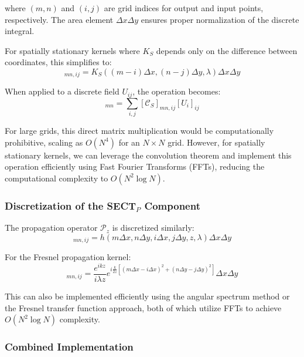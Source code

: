 \documentclass[a4paper,12pt]{article}
\begin{document}
where $(m,n)$ and $(i,j)$ are grid indices for output and input points, respectively. The area element $\Delta x \Delta y$ ensures proper normalization of the discrete integral.

For spatially stationary kernels where $K_S$ depends only on the difference between coordinates, this simplifies to:
\begin{equation}
[\mathcal{C}_S]_{mn,ij} = K_S((m-i)\Delta x, (n-j)\Delta y, \lambda) \Delta x \Delta y
\end{equation}

When applied to a discrete field $U_{ij}$, the operation becomes:
\begin{equation}
[U_s]_{mn} = \sum_{i,j} [\mathcal{C}_S]_{mn,ij} [U_i]_{ij}
\end{equation}

For large grids, this direct matrix multiplication would be computationally prohibitive, scaling as $O(N^4)$ for an $N \times N$ grid. However, for spatially stationary kernels, we can leverage the convolution theorem and implement this operation efficiently using Fast Fourier Transforms (FFTs), reducing the computational complexity to $O(N^2 \log N)$.

\subsubsection{Discretization of the SECT$_P$ Component}

The propagation operator $\mathcal{P}_z$ is discretized similarly:
\begin{equation}
[\mathcal{P}_z]_{mn,ij} = h(m\Delta x, n\Delta y, i\Delta x, j\Delta y, z, \lambda) \Delta x \Delta y
\end{equation}

For the Fresnel propagation kernel:
\begin{equation}
[\mathcal{P}_z]_{mn,ij} = \frac{e^{ikz}}{i\lambda z} e^{i\frac{k}{2z}[(m\Delta x - i\Delta x)^2 + (n\Delta y - j\Delta y)^2]} \Delta x \Delta y
\end{equation}

This can also be implemented efficiently using the angular spectrum method or the Fresnel transfer function approach, both of which utilize FFTs to achieve $O(N^2 \log N)$ complexity.

\subsubsection{Combined Implementation}
\end{document}

